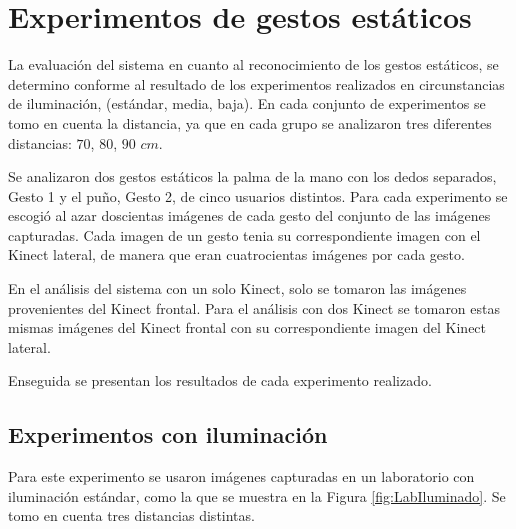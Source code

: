 

\section{Experimentos de gestos estáticos}\label{TestStaticGestures}  

La evaluación del sistema en cuanto al reconocimiento de los gestos estáticos, se determino conforme al resultado de los experimentos realizados en circunstancias de iluminación, (estándar, media, baja). En cada conjunto de experimentos se tomo en cuenta la distancia, ya que en cada grupo se analizaron tres diferentes distancias: $70$, $80$, $90$ $cm$.  

Se analizaron dos gestos estáticos la palma de la mano con los dedos separados, Gesto 1 y el puño, Gesto 2, de cinco usuarios distintos. Para cada experimento se escogió al azar doscientas imágenes de cada gesto del conjunto de las imágenes capturadas. Cada imagen de un gesto tenia su correspondiente imagen con el Kinect lateral, de manera que eran cuatrocientas imágenes por cada gesto. 

En el análisis del sistema con un solo Kinect, solo se tomaron las imágenes provenientes del Kinect frontal. Para el análisis con dos Kinect se tomaron estas mismas imágenes del Kinect frontal con su correspondiente imagen del Kinect lateral.

Enseguida se presentan los resultados de cada experimento realizado.


\subsection{Experimentos con iluminación} 
Para este experimento se usaron imágenes capturadas en un laboratorio con iluminación estándar, como la que se muestra en la Figura \ref{fig:LabIluminado}. Se tomo en cuenta tres distancias distintas. 

